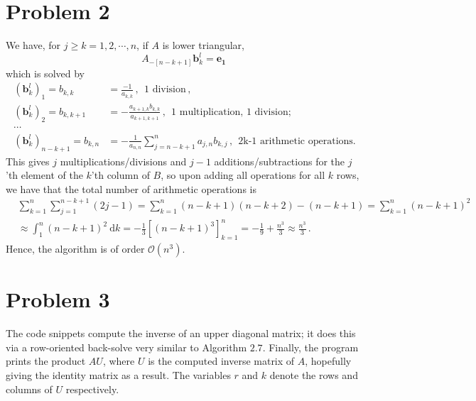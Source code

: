 \documentclass[11pt]{amsart}
\theoremstyle{definition}
\numberwithin{equation}{section}
\begin{document}
\section*{Problem 2}
We have, for $j \geq k = 1, 2, \cdots, n$, if $A$ is lower triangular,
\begin{equation}
A_{-[n-k+1]}\mathbf{b}_k^l = \mathbf{e_1}\,
\end{equation}
which is solved by
\begin{align*}
(\mathbf{b}_k^l)_1 = b_{k,k} &= \frac{-1}{a_{k,k}}\,, \:\: \text{1 division}\,, \\
(\mathbf{b}_k^l)_2 = b_{k, k+1} &= -\frac{a_{k+1,k}b_{k,k}}{a_{k+1,k+1}}\,,
\:\:\text{1 multiplication, 1 division;}
 \\
\cdots \\
(\mathbf{b}_k^l)_{n-k+1} = b_{k, n} &=
-\frac{1}{a_{n,n}}\sum_{j=n-k+1}^n
a_{j,n}b_{k,j}\,,
\:\:\text{2k-1 arithmetic operations.}
\end{align*}
This gives $j$ multiplications/divisions and $j-1$ additions/subtractions for the $j$'th element of the $k$'th column of $B$, so upon adding all operations for all $k$ rows, we have that the total number of arithmetic operations is
\newcommand{\dk}{\:\mbox{d}k}
\begin{align*}
&\sum_{k=1}^n
\sum_{j= 1}^{n-k+1}
(2j - 1)
=
\sum_{k=1}^n
(n-k+1)(n-k+2) - (n-k+1)
=
\sum_{k=1}^n
(n-k+1)^2 \\
&\approx
\int_1^n (n-k+1)^2 \dk
=
-\frac{1}{3}[(n-k+1)^3]_{k=1}^n = -\frac{1}{9} 
+ \frac{n^3}{3} \approx \frac{n^3}{3}\,.
\end{align*}
Hence, the algorithm is of order $\mathcal{O}(n^3)$.
\section*{Problem 3}
The code snippets compute the inverse of an upper diagonal matrix; it does this via a row-oriented back-solve very similar to Algorithm $2.7$. Finally, the program prints the product $A U$, where $U$ is the computed inverse matrix of $A$, hopefully giving the identity matrix as a result. The variables $r$ and $k$ denote the rows and columns of $U$ respectively.
\end{document}
